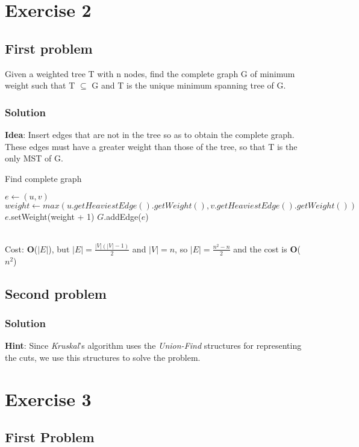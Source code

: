 \documentclass[11pt]{article}
\begin{document}
\section*{Exercise 2}
\subsection*{First problem}
Given a weighted tree T with n nodes, find the complete graph G of minimum weight such that T $\subseteq$ G and T is the unique minimum spanning tree of G.
\subsubsection*{Solution}
\textbf{Idea}: 
Insert edges that are not in the tree so as to obtain the complete graph. These edges must have a greater weight than those of the tree, so that T is the only MST of G. \\
\begin{algorithm}
	\caption{Find complete graph}\label{euclid}
	\begin{algorithmic}[1]
			\State $e \gets (u,v)$
					\State $weight \gets max(u.getHeaviestEdge().getWeight(), v.getHeaviestEdge().getWeight())$
					\State $e$.setWeight(weight + 1)
					\State $G$.addEdge($e$)
				\EndIf
			\EndFor		
		\EndFor
	\end{algorithmic}
\end{algorithm} \\
Cost: \textbf{O}($|E|$), but $|E| = \frac{|V|(|V| - 1)}{2}$ and $|V| = n$, so $|E| = \frac{n^2 - n}{2}$ and the cost is \textbf{O}($n^2$)
\subsection*{Second problem}

\subsubsection*{Solution}
\textbf{Hint}: Since \textit{Kruskal}'s algorithm uses the \textit{Union-Find} structures for representing the cuts, we use this structures to solve the problem. \\
\newpage

\section*{Exercise 3}
\subsection*{First Problem}
\end{document}
